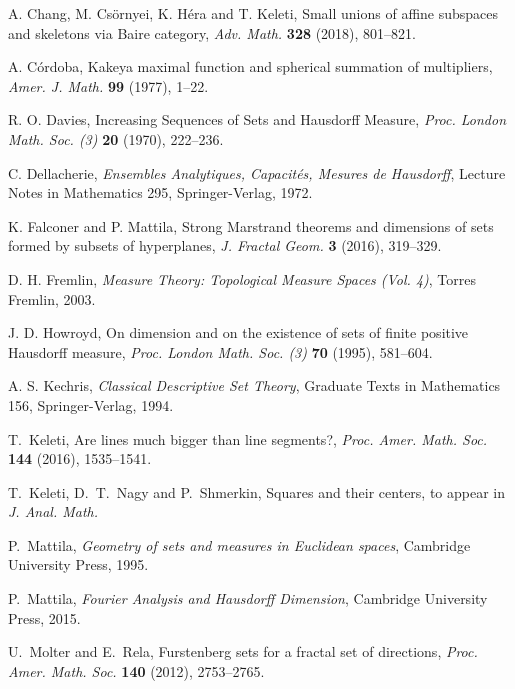 \documentclass[a4paper]{amsart}
\theoremstyle{definition} \newtheorem{remark}[theorem]{Remark}
\begin{document}
\begin{thebibliography}{10}

A. Chang, M. Cs\"ornyei, K. H\'era and T. Keleti,
\newblock Small unions of affine subspaces and skeletons via Baire category, 
\newblock \textit{Adv. Math.} \textbf{328} (2018), 801--821.

A. C\'ordoba, 
\newblock Kakeya maximal function and spherical summation of multipliers, 
\newblock \textit{Amer. J. Math.} \textbf{99} (1977), 1--22.

R. O. Davies, Increasing Sequences of Sets and Hausdorff Measure,
\textit{Proc. London Math. Soc. (3)} \textbf{20} (1970), 222--236.

C. Dellacherie, 
\newblock \textit{Ensembles Analytiques, Capacit\'es, Mesures de Hausdorff},
\newblock Lecture Notes in Mathematics 295, Springer-Verlag, 1972. 

K. Falconer and P. Mattila, 
\newblock Strong Marstrand theorems and dimensions of sets formed by subsets of hyperplanes, 
\newblock  \textit{J. Fractal Geom.} \textbf{3} (2016), 319--329.

D. H. Fremlin, 
\newblock \textit{Measure Theory: Topological Measure Spaces (Vol. 4)}, 
Torres Fremlin, 2003.

J. D. Howroyd,
\newblock On dimension and on the existence of sets of finite positive Hausdorff measure,
\newblock \textit{Proc. London Math. Soc. (3)} \textbf{70} (1995), 581--604.

A. S. Kechris, 
\newblock \textit{Classical Descriptive Set Theory}, 
\newblock Graduate Texts in Mathematics 156, Springer-Verlag, 1994.

T.~Keleti, 
\newblock Are lines much bigger than line segments?, 
\newblock \textit{Proc. Amer. Math. Soc.} \textbf{144} (2016), 1535--1541. 

T.~Keleti, D.~T.~Nagy and P.~Shmerkin,
\newblock Squares and their centers, 
\newblock to appear in \textit{J. Anal. Math.}

P.~Mattila, 
\newblock \textit{Geometry of sets and measures in Euclidean spaces}, 
\newblock Cambridge University Press, 1995.

P.~Mattila, 
\newblock \textit{Fourier Analysis and Hausdorff Dimension},
\newblock Cambridge University Press, 2015.

U.~Molter and E.~Rela,
\newblock Furstenberg sets for a fractal set of directions,
\newblock \textit{Proc. Amer. Math. Soc.} \textbf{140} (2012), 2753--2765. 



\end{thebibliography}
\end{document}
